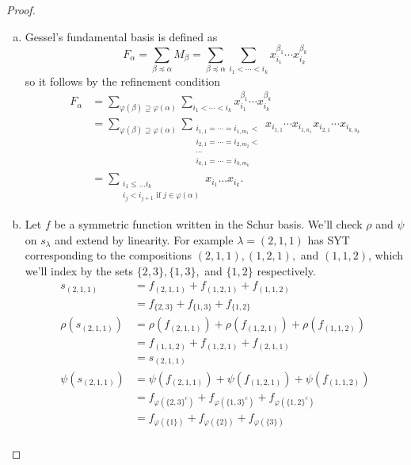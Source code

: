 \documentclass{article}
\begin{document}
\begin{proof}
\begin{enumerate}[(a)]
    \item Gessel's fundamental basis is defined as \[
      F_\alpha
      = \sum_{\beta \preceq \alpha} M_\beta
      = \sum_{\beta \preceq \alpha} \sum_{i_1 < \cdots < i_k} x_{i_1}^{\beta_1} \cdots x_{i_k}^{\beta_k}
    \] so it follows by the refinement condition \begin{align*}
      F_\alpha
      &= \sum_{\varphi(\beta) \supseteq \varphi(\alpha)} \sum_{i_1 < \cdots < i_k} x_{i_1}^{\beta_1} \cdots x_{i_k}^{\beta_k}\\
      &= \sum_{\varphi(\beta) \supseteq \varphi(\alpha)} \sum_{\substack{
        i_{1,1} = \cdots = i_{1,m_1} <\\
        i_{2,1} = \cdots = i_{2,m_2} <\\
        \cdots  \\
        i_{k,1} = \cdots = i_{k,m_k}}} x_{i_{1,1}} \cdots x_{i_{1,n_1}} x_{i_{2,1}} \cdots x_{i_{k, n_k}} \\
      &= \sum_{\substack{
        i_1 \leq \hdots i_k\\
        i_j < i_{j+1} \text{ if } j \in \varphi(\alpha)
      }} x_{i_1} \hdots x_{i_k}.
    \end{align*}
    \item Let $f$ be a symmetric function written in the Schur basis. We'll
    check $\rho$ and $\psi$ on $s_\lambda$ and extend by linearity.
    For example $\lambda = (2,1,1)$ has SYT corresponding to the compositions
    $(2,1,1), (1,2,1),$ and $(1,1,2)$, which we'll index by the sets
    $\{2,3\}, \{1,3\},$ and $\{1,2\}$ respectively.
    \begin{align*}
      s_{(2,1,1)}       &= f_{(2,1,1)} + f_{(1,2,1)} + f_{(1,1,2)} \\
                        &= f_{\{2,3\}} + f_{\{1,3\}} + f_{\{1,2\}} \\
      \rho(s_{(2,1,1)}) &= \rho(f_{(2,1,1)}) + \rho(f_{(1,2,1)}) + \rho(f_{(1,1,2)}) \\
                        &= f_{(1,1,2)} + f_{(1,2,1)} + f_{(2,1,1)} \\
                        &= s_{(2,1,1)} \\
      \psi(s_{(2,1,1)}) &= \psi(f_{(2,1,1)}) + \psi(f_{(1,2,1)}) + \psi(f_{(1,1,2)}) \\
                        &= f_{\varphi(\{2,3\}^c)} + f_{\varphi(\{1,3\}^c)} + f_{\varphi(\{1,2\}^c)} \\
                        &= f_{\varphi(\{1\})} + f_{\varphi(\{2\})} + f_{\varphi(\{3\})} \\

\end{align*}
\end{enumerate}
\end{proof}
\end{document}
